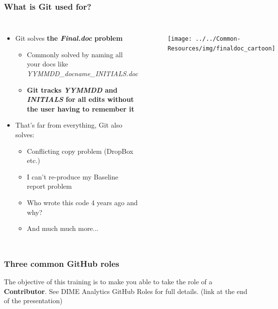 \documentclass[aspectratio=169]{beamer} %
\begin{document}
\begin{frame}
\frametitle{What is Git used for?}

	\begin{columns}[c]

		\begin{itemize}
			\item Git solves \textbf{the \textit{Final.doc} problem}
			\begin{itemize}
				\item <2-> Commonly solved by naming all your docs like \textit{YYMMDD\_docname\_INITIALS.doc}
				\item <3-> \textbf{Git tracks \textit{YYMMDD} and \textit{INITIALS} for all edits  without the user having to remember it}
			\end{itemize}
			\item <4->That's far from everything, Git also solves:
			\begin{itemize}
				\item <4->Conflicting copy problem (DropBox etc.)
				\item <4->I can't re-produce my Baseline report problem
				\item <4->Who wrote this code 4 years ago and why?
				\item <4->And much much more...
			\end{itemize}
		\end{itemize}

		\begin{figure}
			\centering
			\texttt{[image: ../../Common-Resources/img/finaldoc\_cartoon]}
			\label{fig:finaldoccartoon}
		\end{figure}

	\end{columns}
\end{frame}



\begin{frame}
	\frametitle{Three common GitHub roles}
	
	\small The objective of this training is to make you able to take the role of a \textbf{Contributor}. See DIME Analytics GitHub Roles for full details. (link at the end of the presentation)
	
	
	
\end{frame}
\end{document}
